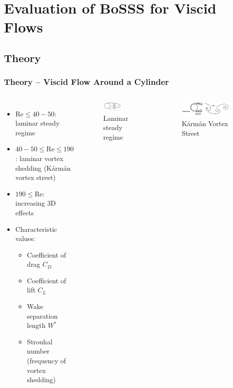 \section{Evaluation of BoSSS for Viscid Flows}
\frame{\tableofcontents[currentsection]}
	\subsection{Theory}
	\begin{frame}
		\frametitle{Theory -- Viscid Flow Around a Cylinder}
		\begin{columns}[t]
			\column[]{6cm}
			\vspace{-0.5cm}
			\begin{itemize}
				\item $\text{Re} \leq 40-50$: laminar steady regime
				\item $40-50 \leq \text{Re} \leq 190$: laminar vortex shedding (Kármán vortex street)
				\item $190 \leq \text{Re}$: increasing 3D effects
				\pause
				\item Characteristic values:
				\begin{itemize}
					\item Coefficient of drag $C_D$
					\item Coefficient of lift $C_L$
					\item Wake separation length $W^*$
					\item Strouhal number (frequency of vortex shedding)
				\end{itemize}
			\end{itemize}
			\column[]{6cm}
			\onslide
			\begin{figure}[ht]
				 \vspace{-1cm}
				\includegraphics[width=0.6\textwidth]{img/steadyFlow_modifiedWilliamson.PNG}
				\caption{Laminar steady regime \cite{williamson} }
			\end{figure}
			\begin{figure}[htbp]
				\includegraphics[width=\textwidth]{img/unsteady_Williamson.PNG}
				\caption{Kármán Vortex Street \cite{williamson} }
			\end{figure} 
		\end{columns}
	\end{frame}
